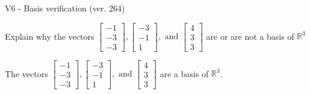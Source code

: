 \begin{exercise}
  \begin{exerciseTitle}V6 - Basis verification (ver. 264)\end{exerciseTitle}
  \begin{exerciseStatement}
    Explain why the vectors \(\left[\begin{array}{r}
-1 \\
-3 \\
-3
\end{array}\right] , \left[\begin{array}{r}
-3 \\
-1 \\
1
\end{array}\right] , \text{ and } \left[\begin{array}{r}
4 \\
3 \\
3
\end{array}\right]\) are or are not a basis of \(\mathbb{R}^3\)	


  \end{exerciseStatement}
  \begin{exerciseAnswer}
   The vectors \(\left[\begin{array}{r}
-1 \\
-3 \\
-3
\end{array}\right] , \left[\begin{array}{r}
-3 \\
-1 \\
1
\end{array}\right] , \text{ and } \left[\begin{array}{r}
4 \\
3 \\
3
\end{array}\right]\) 
  	 are  a basis of \(\mathbb{R}^3\).
  


  \end{exerciseAnswer}
\end{exercise}